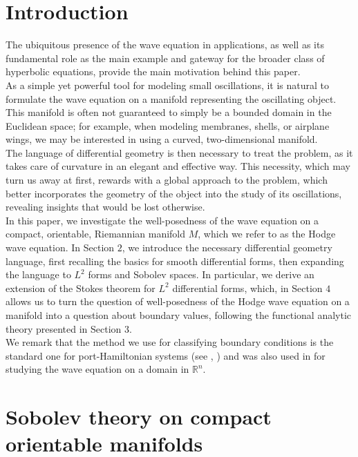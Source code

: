 \documentclass{ifacconf}
\newcommand{\R}{\mathbb{R}}
\begin{document}
\section{Introduction}
The ubiquitous presence of the wave equation in applications, as well as its fundamental role as the main example and gateway for the broader class of hyperbolic equations, provide the main motivation behind this paper.\\
As a simple yet powerful tool for modeling small oscillations, it is natural to formulate the wave equation on a manifold representing the oscillating object. This manifold is often not guaranteed to simply be a bounded domain in the Euclidean space; for example, when modeling membranes, shells, or airplane wings, we may be interested in using a curved, two-dimensional manifold.\\
The language of differential geometry is then necessary to treat the problem, as it takes care of curvature in an elegant and effective way. This necessity, which may turn us away at first, rewards with a global approach to the problem, which better incorporates the geometry of the object into the study of its oscillations, revealing insights that would be lost otherwise.\\
In this paper, we investigate the well-posedness of the wave equation on a compact, orientable, Riemannian manifold $M$, which we refer to as the Hodge wave equation.
In Section $2$, we introduce the necessary differential geometry language, first recalling the basics for smooth differential forms, then expanding the language to $L^2$ forms and Sobolev spaces. In particular, we derive an extension of the Stokes theorem for $L^2$ differential forms, which, in Section $4$ allows us to turn the question of well-posedness of the Hodge wave equation on a manifold into a question about boundary values, following the functional analytic theory presented in Section $3$.\\
We remark that the method we use for classifying boundary conditions is the standard one for port-Hamiltonian systems (see \cite{ScM:02}, \cite{JZ:12}) and was also used in \cite{KZ:15} for studying the wave equation on a domain in $\R^n$.

\section{Sobolev theory on compact orientable manifolds}
\end{document}
